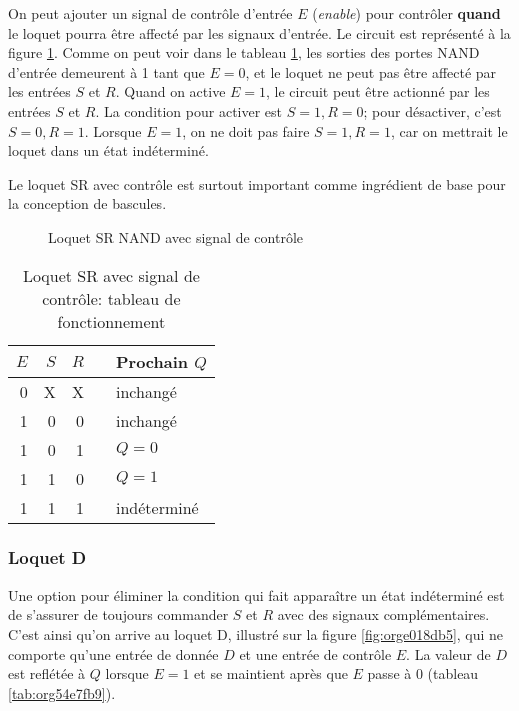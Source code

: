 \documentclass[11pt]{article}
\begin{document}
On peut ajouter un signal de contrôle d'entrée \(E\) (\emph{enable}) pour
contrôler \textbf{quand} le loquet pourra être affecté par les signaux
d'entrée. Le circuit est représenté à la figure \ref{fig:org346b518}. Comme
on peut voir dans le tableau \ref{tab:org700bc7c}, les sorties des portes
NAND d'entrée demeurent à 1 tant que \(E = 0\), et le loquet ne peut
pas être affecté par les entrées \(S\) et \(R\). Quand on active \(E
= 1\), le circuit peut être actionné par les entrées \(S\) et \(R\). La condition pour activer est \(S=1, R=0\); pour désactiver,
c'est \(S=0, R=1\). Lorsque \(E = 1\), on ne doit pas faire \(S=1,
R=1\), car on mettrait le loquet dans un état indéterminé.

Le loquet SR avec contrôle est surtout important comme
ingrédient de base pour la conception de bascules.

\begin{figure}[htbp]
\centering

\caption{\label{fig:org346b518}Loquet SR NAND avec signal de contrôle}
\end{figure}

\begin{table}[htbp]
\caption{\label{tab:org700bc7c}Loquet SR avec signal de contrôle: tableau de fonctionnement}
\centering
\begin{tabular}{rrrll}
\(E\) & \(S\) & \(R\) &  & Prochain \(Q\)\\[0pt]
\hline
0 & X & X &  & inchangé\\[0pt]
1 & 0 & 0 &  & inchangé\\[0pt]
1 & 0 & 1 &  & \(Q = 0\)\\[0pt]
1 & 1 & 0 &  & \(Q = 1\)\\[0pt]
1 & 1 & 1 &  & indéterminé\\[0pt]
\end{tabular}
\end{table}

\subsubsection{Loquet D}
\label{sec:orgb4af741}

Une option pour éliminer la condition qui fait apparaître un état
indéterminé est de s'assurer de toujours commander \(S\) et \(R\)
avec des signaux complémentaires. C'est ainsi qu'on arrive au loquet
D, illustré sur la figure \ref{fig:orge018db5}, qui ne comporte qu'une entrée de
donnée \(D\) et une entrée de contrôle \(E\). La valeur de \(D\) est
reflétée à \(Q\) lorsque \(E=1\) et se maintient après que \(E\) passe
à 0 (tableau \ref{tab:org54e7fb9}).
\end{document}
